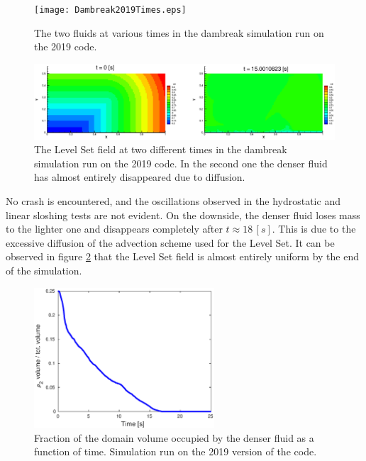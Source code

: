 \documentclass[11pt, a4paper, oneside, openany]{book}
\begin{document}
\begin{figure}[!ht]
	\centering
	\texttt{[image: Dambreak2019Times.eps]}
	\caption[Dambreak AMR 2019]{The two fluids at various times in the dambreak simulation run on the 2019 code.}\label{Dambreak2019Times}
\end{figure}\noindent
\begin{figure}[!ht]
	\centering
	\includegraphics[width=1.1\textwidth]{Dambreak2019LS.eps}
	\caption[Dambreak 2019 Level Set Diffusion]{The Level Set field at two different times in the dambreak simulation run on the 2019 code. In the second one the denser fluid has almost entirely disappeared due to diffusion.}\label{Dambreak2019LS}
\end{figure}\noindent
No crash is encountered, and the oscillations observed in the hydrostatic and linear sloshing tests are not evident. On the downside, the denser fluid loses mass to the lighter one and disappears completely after $t\approx 18\,[s]$. This is due to the excessive diffusion of the advection scheme used for the Level Set. It can be observed in figure \ref{Dambreak2019LS} that the Level Set field is almost entirely uniform by the end of the simulation.\par
\begin{figure}[!ht]
	\centering
	\includegraphics[width=0.6\textwidth]{DambreakVolumeDecrease2019.eps}
	\caption[Dambreak 2019 Denser fluid volume vs. time]{Fraction of the domain volume occupied by the denser fluid as a function of time. Simulation run on the 2019 version of the code.}\label{DambreakVolumeDecrease2019}
\end{figure}\noindent
\end{document}
